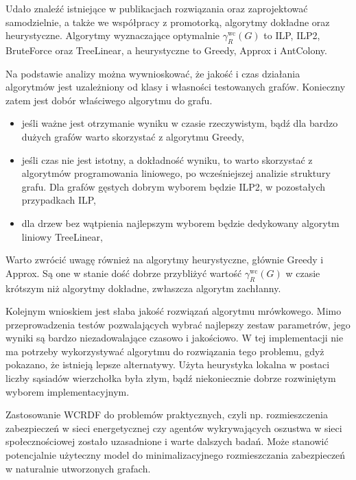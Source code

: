 Udało znaleźć istniejące w publikacjach rozwiązania oraz zaprojektować samodzielnie, a także we współpracy z promotorką, algorytmy dokładne oraz heurystyczne. Algorytmy wyznaczające optymalnie $\gamma^{\text{wc}}_R(G)$ to ILP, ILP2, BruteForce oraz TreeLinear, a heurystyczne to Greedy, Approx i AntColony.

Na podstawie analizy można wywnioskować, że jakość i czas działania algorytmów jest uzależniony od klasy i własności testowanych grafów. Konieczny zatem jest dobór właściwego algorytmu do grafu.
\begin{itemize}
    \item jeśli ważne jest otrzymanie wyniku w czasie rzeczywistym, bądź dla bardzo dużych grafów warto skorzystać z algorytmu Greedy,
    \item jeśli czas nie jest istotny, a dokładność wyniku, to warto skorzystać z algorytmów programowania liniowego, po wcześniejszej analizie struktury grafu. Dla grafów gęstych dobrym wyborem będzie ILP2, w pozostałych przypadkach ILP,
    \item dla drzew bez wątpienia najlepszym wyborem będzie dedykowany algorytm liniowy TreeLinear,
\end{itemize}

Warto zwrócić uwagę również na algorytmy heurystyczne, głównie Greedy i Approx. Są one w stanie dość dobrze przybliżyć wartość $\gamma^{\text{wc}}_R(G)$ w czasie krótszym niż algorytmy dokładne, zwłaszcza algorytm zachłanny.

Kolejnym wnioskiem jest słaba jakość rozwiązań algorytmu mrówkowego. Mimo przeprowadzenia testów pozwalających wybrać najlepszy zestaw parametrów, jego wyniki są bardzo niezadowalające czasowo i jakościowo. W tej implementacji nie ma potrzeby wykorzystywać algorytmu do rozwiązania tego problemu, gdyż pokazano, że istnieją lepsze alternatywy. Użyta heurystyka lokalna w postaci liczby sąsiadów wierzchołka była złym, bądź niekoniecznie dobrze rozwiniętym wyborem implementacyjnym.

Zastosowanie WCRDF do problemów praktycznych, czyli np. rozmieszczenia zabezpieczeń w sieci energetycznej czy agentów wykrywających oszustwa w sieci społecznościowej zostało uzasadnione i warte dalszych badań. Może stanowić potencjalnie użyteczny model do minimalizacyjnego rozmieszczania zabezpieczeń w naturalnie utworzonych grafach.

